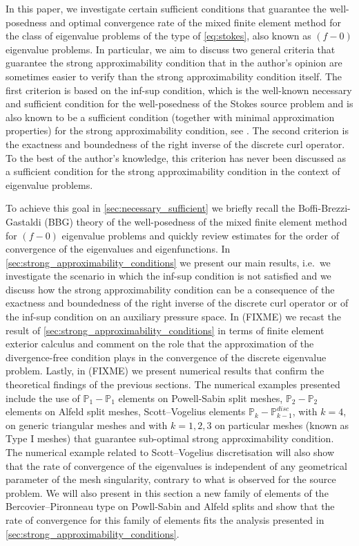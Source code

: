 \documentclass[USenglish]{article}
\theoremstyle{dgthm}
\theoremstyle{dgdef}
\begin{document}
In this paper, we investigate certain sufficient conditions that guarantee the well-posedness and optimal convergence rate of the mixed finite element method for the class of eigenvalue problems of the type of \eqref{eq:stokes}, also known as $(f\!-\!0)$ eigenvalue problems.
In particular, we aim to discuss two general criteria that guarantee the strong approximability condition that in the author's opinion are sometimes easier to verify than the strong approximability condition itself.
The first criterion is based on the inf-sup condition, which is the well-known necessary and sufficient condition for the well-posedness of the Stokes source problem and is also known to be a sufficient condition (together with minimal approximation properties) for the strong approximability condition, see \cite{BBF,BBG}.
The second criterion is the exactness and boundedness of the right inverse of the discrete curl operator. To the best of the author's knowledge, this criterion has never been discussed as a sufficient condition for the strong approximability condition in the context of eigenvalue problems.

To achieve this goal in \cref{sec:necessary_sufficient} we briefly recall the Boffi-Brezzi-Gastaldi (BBG) theory of the well-posedness of the mixed finite element method for $(f\!-\!0)$ eigenvalue problems and quickly review estimates for the order of convergence of the eigenvalues and eigenfunctions.
In \cref{sec:strong_approximability_conditions} we present our main results, i.e.~we investigate the scenario in which the inf-sup condition is not satisfied and we discuss how the strong approximability condition can be a consequence of the exactness and boundedness of the right inverse of the discrete curl operator or of the inf-sup condition on an auxiliary pressure space.
In (FIXME) we recast the result of \cref{sec:strong_approximability_conditions} in terms of finite element exterior calculus and comment on the role that the approximation of the divergence-free condition plays in the convergence of the discrete eigenvalue problem.
Lastly, in (FIXME) we present numerical results that confirm the theoretical findings of the previous sections.
The numerical examples presented include the use of $\mathbb{P}_1-\mathbb{P}_1$ elements on Powell-Sabin split meshes, $\mathbb{P}_2-\mathbb{P}_2$ elements on Alfeld split meshes, Scott--Vogelius elements $\mathbb{P}_k-\mathbb{P}_{k-1}^{disc}$, with $k=4$, on generic triangular meshes and with $k=1,2,3$ on particular meshes (known as Type I meshes) that guarantee sub-optimal strong approximability condition.
The numerical example related to Scott--Vogelius discretisation will also show that the rate of convergence of the eigenvalues is independent of any geometrical parameter of the mesh singularity, contrary to what is observed for the source problem.
We will also present in this section a new family of elements of the Bercovier--Pironneau type on Powll-Sabin and Alfeld splits and show that the rate of convergence for this family of elements fits the analysis presented in \cref{sec:strong_approximability_conditions}.
\end{document}
